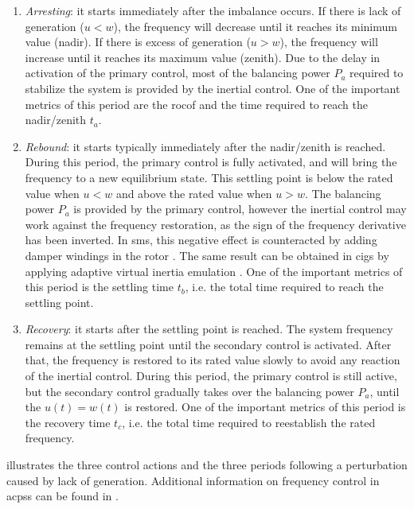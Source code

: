 \documentclass[utf8]{frontiersSCNS} %
\begin{document}
\begin{enumerate}%
    \item \textit{Arresting}: it starts immediately after the imbalance occurs. If there is lack of generation ($u < w$), the frequency will decrease until it reaches its minimum value (nadir). If there is excess of generation ($u > w$), the frequency will increase until it reaches its maximum value (zenith). Due to the delay in activation of the primary control, most of the balancing power $ P_a $ required to stabilize the system is provided by the inertial control. One of the important metrics of this period are the \gls{rocof} and the time required to reach the nadir/zenith $t_a$.
    
    \item \textit{Rebound}: it starts typically immediately after the nadir/zenith is reached. During this period, the primary control is fully activated, and will bring the frequency to a new equilibrium state. This settling point is below the rated value when $u < w$ and above the rated value when $u > w$. The balancing power $ P_a $ is provided by the primary control, however the inertial control may work against the frequency restoration, as the sign of the frequency derivative has been inverted. In \glspl{sm}, this negative effect is counteracted by adding damper windings in the rotor \citep{KundurPowersystemstability1994}. The same result can be obtained in \glspl{cig} by applying adaptive virtual inertia emulation \citep{fangInertiaFutureMoreElectronics2019}. One of the important metrics of this period is the settling time $t_b$, i.e. the total time required to reach the settling point.
    
    \item \textit{Recovery}: it starts after the settling point is reached. The system frequency remains at the settling point until the secondary control is activated. After that, the frequency is restored to its rated value slowly to avoid any reaction of the inertial control. During this period, the primary control is still active, but the secondary control gradually takes over the balancing power $ P_a $, until the $u(t) = w(t)$ is restored. One of the important metrics of this period is the recovery time $t_c$, i.e. the total time required to reestablish the rated frequency.
\end{enumerate}

 illustrates the three control actions and the three periods following a perturbation caused by lack of generation. Additional information on frequency control in \glspl{acps} can be found in \cite{KundurPowersystemstability1994,machowskiPowerSystemDynamics2008,vandoornMicrogridsHierarchicalControl2013,etoFrequencyControlRequirements2018,milanoFoundationsChallengesLowInertia2018,fangInertiaFutureMoreElectronics2019,dossantosalonsoConsiderationsCommunicationInfrastructures2019,brandaoOptimalMultiobjectiveControl2020}.
\end{document}
